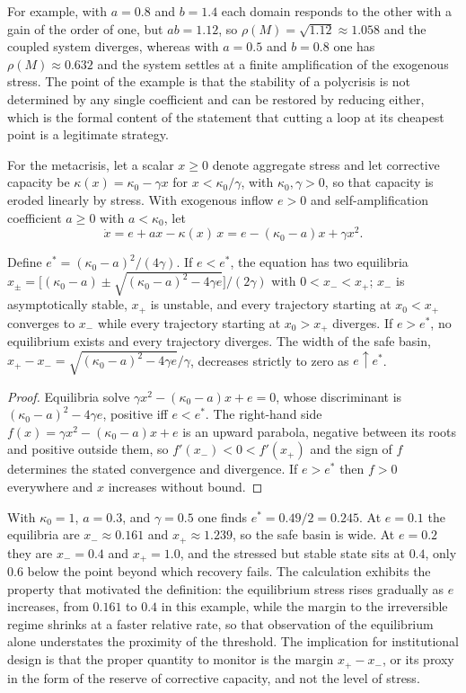 For example, with $a=0.8$ and $b=1.4$ each domain responds to the other with a gain of the order of one, but $ab=1.12$, so $\rho(M)=\sqrt{1.12}\approx1.058$ and the coupled system diverges, whereas with $a=0.5$ and $b=0.8$ one has $\rho(M)\approx0.632$ and the system settles at a finite amplification of the exogenous stress. The point of the example is that the stability of a polycrisis is not determined by any single coefficient and can be restored by reducing either, which is the formal content of the statement that cutting a loop at its cheapest point is a legitimate strategy.

For the metacrisis, let a scalar $x\ge0$ denote aggregate stress and let corrective capacity be $\kappa(x)=\kappa_0-\gamma x$ for $x<\kappa_0/\gamma$, with $\kappa_0,\gamma>0$, so that capacity is eroded linearly by stress. With exogenous inflow $e>0$ and self-amplification coefficient $a\ge0$ with $a<\kappa_0$, let
\[
\dot x=e+a x-\kappa(x)\,x=e-(\kappa_0-a)x+\gamma x^2 .
\]

\begin{proposition}
Define $e^\ast=(\kappa_0-a)^2/(4\gamma)$. If $e<e^\ast$, the equation has two equilibria $x_\pm=\bigl[(\kappa_0-a)\pm\sqrt{(\kappa_0-a)^2-4\gamma e}\bigr]/(2\gamma)$ with $0<x_-<x_+$; $x_-$ is asymptotically stable, $x_+$ is unstable, and every trajectory starting at $x_0<x_+$ converges to $x_-$ while every trajectory starting at $x_0>x_+$ diverges. If $e>e^\ast$, no equilibrium exists and every trajectory diverges. The width of the safe basin, $x_+-x_-=\sqrt{(\kappa_0-a)^2-4\gamma e}/\gamma$, decreases strictly to zero as $e\uparrow e^\ast$.
\end{proposition}

\begin{proof}
Equilibria solve $\gamma x^2-(\kappa_0-a)x+e=0$, whose discriminant is $(\kappa_0-a)^2-4\gamma e$, positive iff $e<e^\ast$. The right-hand side $f(x)=\gamma x^2-(\kappa_0-a)x+e$ is an upward parabola, negative between its roots and positive outside them, so $f'(x_-)<0<f'(x_+)$ and the sign of $f$ determines the stated convergence and divergence. If $e>e^\ast$ then $f>0$ everywhere and $x$ increases without bound.
\end{proof}

With $\kappa_0=1$, $a=0.3$, and $\gamma=0.5$ one finds $e^\ast=0.49/2=0.245$. At $e=0.1$ the equilibria are $x_-\approx0.161$ and $x_+\approx1.239$, so the safe basin is wide. At $e=0.2$ they are $x_-=0.4$ and $x_+=1.0$, and the stressed but stable state sits at $0.4$, only $0.6$ below the point beyond which recovery fails. The calculation exhibits the property that motivated the definition: the equilibrium stress rises gradually as $e$ increases, from $0.161$ to $0.4$ in this example, while the margin to the irreversible regime shrinks at a faster relative rate, so that observation of the equilibrium alone understates the proximity of the threshold. The implication for institutional design is that the proper quantity to monitor is the margin $x_+-x_-$, or its proxy in the form of the reserve of corrective capacity, and not the level of stress.
